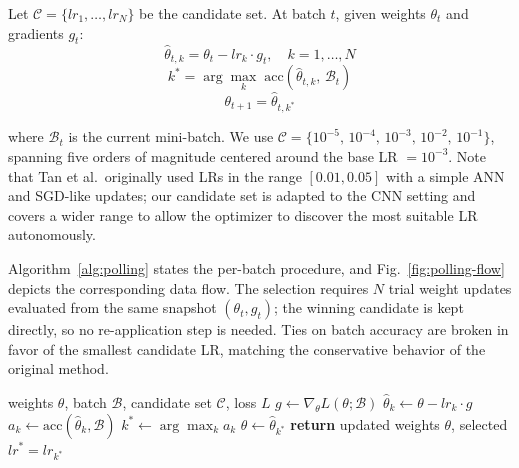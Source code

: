 \documentclass[conference]{IEEEtran}
\begin{document}
Let $\mathcal{C} = \{lr_1, \ldots, lr_N\}$ be the candidate set. At batch $t$, given weights $\theta_t$ and gradients $g_t$:
\begin{equation}
\hat{\theta}_{t,k} = \theta_t - lr_k \cdot g_t, \quad k = 1,\ldots,N
\end{equation}
\begin{equation}
k^{*} = \arg\max_{k} \; \mathrm{acc}(\hat{\theta}_{t,k},\, \mathcal{B}_t)
\end{equation}
\begin{equation}
\theta_{t+1} = \hat{\theta}_{t,k^{*}}
\end{equation}

where $\mathcal{B}_t$ is the current mini-batch. We use $\mathcal{C} = \{10^{-5},\, 10^{-4},\, 10^{-3},\, 10^{-2},\, 10^{-1}\}$, spanning five orders of magnitude centered around the base LR $= 10^{-3}$. Note that Tan et al.\ originally used LRs in the range $[0.01, 0.05]$ with a simple ANN and SGD-like updates; our candidate set is adapted to the CNN setting and covers a wider range to allow the optimizer to discover the most suitable LR autonomously.

Algorithm~\ref{alg:polling} states the per-batch procedure, and Fig.~\ref{fig:polling-flow} depicts the corresponding data flow. The selection requires $N$ trial weight updates evaluated from the same snapshot $(\theta_t, g_t)$; the winning candidate is kept directly, so no re-application step is needed. Ties on batch accuracy are broken in favor of the smallest candidate LR, matching the conservative behavior of the original method.

\begin{algorithm}[htbp]
\caption{Polling step (base method, one batch)}
\label{alg:polling}
\begin{algorithmic}[1]
\REQUIRE weights $\theta$, batch $\mathcal{B}$, candidate set $\mathcal{C}$, loss $L$
\STATE $g \leftarrow \nabla_\theta L(\theta; \mathcal{B})$ 
    \STATE $\hat{\theta}_k \leftarrow \theta - lr_k \cdot g$ 
    \STATE $a_k \leftarrow \mathrm{acc}(\hat{\theta}_k, \mathcal{B})$
\ENDFOR
\STATE $k^{*} \leftarrow \arg\max_k a_k$ 
\STATE $\theta \leftarrow \hat{\theta}_{k^{*}}$
\STATE \textbf{return} updated weights $\theta$, selected $lr^{*} = lr_{k^{*}}$
\end{algorithmic}
\end{algorithm}
\end{document}

